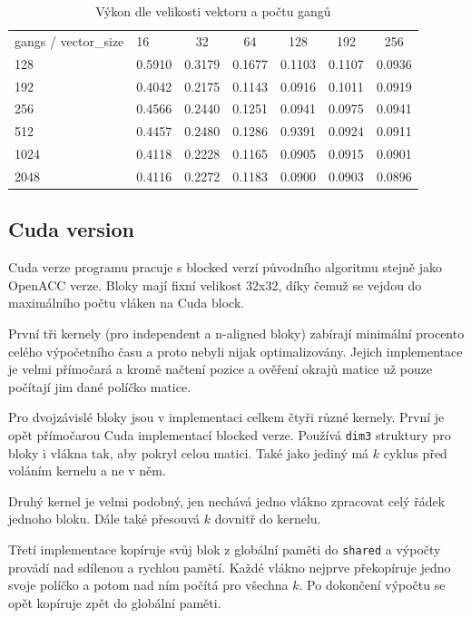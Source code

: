 \documentclass[11pt, fleqn]{article}
\begin{document}
\begin{table}[tbp]
  \centering
  \caption{Výkon dle velikosti vektoru a počtu gangů}
  \label{fig:fw2}
  \def\arraystretch{2}
  \begin{tabular}{llccccc}
    gangs / vector\_size & 16 & 32 & 64 & 128 & 192 & 256 \\
    \rowcolor[HTML]{ECF4FF} 
    128  & 0.5910 & 0.3179 & 0.1677 & 0.1103 & 0.1107 & 0.0936 \\
    192  & 0.4042 & 0.2175 & 0.1143 & 0.0916 & 0.1011 & 0.0919 \\
    \rowcolor[HTML]{ECF4FF} 
    256  & 0.4566 & 0.2440 & 0.1251 & 0.0941 & 0.0975 & 0.0941 \\
    512  & 0.4457 & 0.2480 & 0.1286 & 0.9391 & 0.0924 & 0.0911 \\
    \rowcolor[HTML]{ECF4FF} 
    1024 & 0.4118 & 0.2228 & 0.1165 & 0.0905 & 0.0915 & 0.0901 \\
    2048 & 0.4116 & 0.2272 & 0.1183 & 0.0900 & 0.0903 & 0.0896
  \end{tabular}
\end{table}

\subsection{Cuda version}

Cuda verze programu pracuje s blocked verzí původního algoritmu stejně jako OpenACC verze. Bloky mají fixní velikost 32x32, díky čemuž se vejdou do maximálního počtu vláken na Cuda block.

První tři kernely (pro independent a n-aligned bloky) zabírají minimální procento celého výpočetního času a proto nebyli nijak optimalizovány. Jejich implementace je velmi přímočará a kromě načtení pozice a ověření okrajů matice už pouze počítají jim dané políčko matice.

Pro dvojzávislé bloky jsou v implementaci celkem čtyři různé kernely. První je opět přímočarou Cuda implementací blocked verze. Používá \lstinline{dim3} struktury pro bloky i vlákna tak, aby pokryl celou matici. Také jako jediný má $k$ cyklus před voláním kernelu a ne v něm.

Druhý kernel je velmi podobný, jen nechává jedno vlákno zpracovat celý řádek jednoho bloku. Dále také přesouvá $k$ dovnitř do kernelu.

Třetí implementace kopíruje svůj blok z globální paměti do \lstinline{shared} a výpočty provádí nad sdílenou a rychlou pamětí. Každé vlákno nejprve překopíruje jedno svoje políčko a potom nad ním počítá pro všechna $k$. Po dokončení výpočtu se opět kopíruje zpět do globální paměti.
\end{document}
